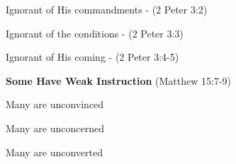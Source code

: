 \begin{compactenum}[I.]
    \begin{compactenum}[A.]
		\item Ignorant of His commandments - (2 Peter 3:2)
		\item Ignorant of the conditions - (2 Peter 3:3)
		\item Ignorant of His coming - (2 Peter 3:4-5)
	\end{compactenum}
    \item \textbf{Some Have Weak Instruction} (Matthew 15:7-9)
    \begin{compactenum}[A.]
		\item Many are unconvinced 
		\item Many are unconcerned 
		\item Many are unconverted
	\end{compactenum}
\end{compactenum}


